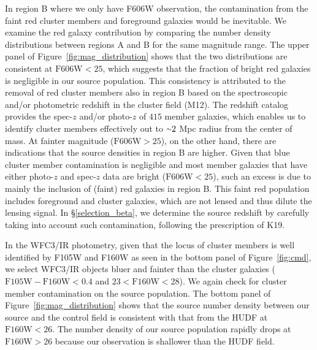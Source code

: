 \documentclass[twocolumn]{aastex631}
\newcommand{\mytilde}{\raise.19ex\hbox{$\scriptstyle\sim$}}
\begin{document}
In region B where we only have F606W observation, the contamination from the faint red cluster members and foreground galaxies would be inevitable. We examine the red galaxy contribution by comparing the number density distributions between regions A and B for the same magnitude range. 
The upper panel of Figure~\ref{fig:mag_distribution} shows that the two distributions are consistent at $\mbox{F606W} < 25$, which suggests that the fraction of bright red galaxies is negligible in our source population. 
This consistency is attributed to the removal of red cluster members also in region B based on the spectroscopic and/or photometric redshift in the cluster field (M12). The redshift catalog provides the spec-$z$ and/or photo-$z$ of $415$ member galaxies, which enables us to identify cluster members effectively out to $\mytilde2$ Mpc radius from the center of mass. 
At fainter magnitude ($\mbox{F606W} > 25$), on the other hand, there are indications that the source densities in region B are higher. Given that blue cluster member contamination is negligible and most member galaxies that have either photo-$z$ and spec-$z$ data are bright ($\mbox{F606W} < 25$), such an excess is due to mainly the inclusion of (faint) red galaxies in region B. This faint red population includes foreground and cluster galaxies, which are not lensed and thus dilute the lensing signal. 
In \S\ref{selection_beta}, we determine the source redshift by carefully taking into account such contamination, following the prescription of K19. 


In the WFC3/IR photometry, given that the locus of cluster members is well identified by F105W and F160W as seen in the bottom panel of Figure~\ref{fig:cmd}, we select WFC3/IR objects bluer and fainter than the cluster galaxies ($\mbox{F105W}-\mbox{F160W}< 0.4$ and $23 < \mbox{F160W} < 28$). 
We again check for cluster member contamination on the source population. 
The bottom panel of Figure~\ref{fig:mag_distribution} shows that the source number density between our source and the control field is consistent with that from the HUDF at $\mbox{F160W} < 26$. 
The number density of our source population rapidly drops at $\mbox{F160W} > 26$ because our observation is shallower than the HUDF field.
\end{document}

